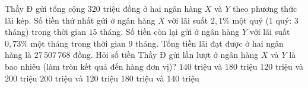 \begin{ex}%
	Thầy Đ gửi tổng cộng $320$ triệu đồng ở hai ngân hàng $X$ và $Y$ theo phương thức lãi kép. Số tiền thứ nhất gửi ở ngân hàng $X$ với lãi suất $2{,}1\%$ một quý ($1$ quý: $3$ tháng) trong thời gian $15$ tháng. Số tiền còn lại gửi ở ngân hàng $Y$ với lãi suất $0{,}73\%$ một tháng trong thời gian $9$ tháng. Tổng tiền lãi đạt được ở hai ngân hàng là $27\,507\,768$ đồng. Hỏi số tiền Thầy Đ gửi lần lượt ở ngân hàng $X$ và $Y$ là bao nhiêu (làm tròn kết quả đến hàng đơn vị)?
	\choice
	{\True $140$ triệu và $180 $ triệu}
	{$120$ triệu và $200 $ triệu}
	{$200$ triệu và $120$ triệu}
	{$180$ triệu và $140$ triệu}
\end{ex}
